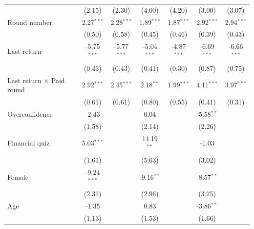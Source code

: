 \begin{table}[htbp]
\begin{tabular}{lcccccc}
                                           & (2.15)        & (2.30)        & (4.00)        & (4.20)        & (3.00)        & (3.07)\\   
      Round number                         & 2.27$^{***}$  & 2.28$^{***}$  & 1.89$^{***}$  & 1.87$^{***}$  & 2.92$^{***}$  & 2.94$^{***}$\\   
                                           & (0.50)        & (0.58)        & (0.45)        & (0.46)        & (0.39)        & (0.43)\\   
      Last return                          & -5.75$^{***}$ & -5.77$^{***}$ & -5.04$^{***}$ & -4.87$^{***}$ & -6.69$^{***}$ & -6.66$^{***}$\\   
                                           & (0.43)        & (0.43)        & (0.41)        & (0.30)        & (0.87)        & (0.75)\\   
      Last return $\times$ Paid round      & 2.92$^{***}$  & 2.45$^{***}$  & 2.18$^{**}$   & 1.99$^{***}$  & 4.11$^{***}$  & 3.97$^{***}$\\   
                                           & (0.61)        & (0.61)        & (0.80)        & (0.55)        & (0.41)        & (0.31)\\   
      Overconfidence                       & -2.43         &               & 0.04          &               & -5.58$^{**}$  &   \\   
                                           & (1.58)        &               & (2.14)        &               & (2.26)        &   \\   
      Financial quiz                       & 5.03$^{***}$  &               & 14.19$^{**}$  &               & -1.03         &   \\   
                                           & (1.61)        &               & (5.63)        &               & (3.02)        &   \\   
      Female                               & -9.24$^{***}$ &               & -9.16$^{**}$  &               & -8.57$^{**}$  &   \\   
                                           & (2.31)        &               & (2.96)        &               & (3.75)        &   \\   
      Age                                  & -1.35         &               & 0.83          &               & -3.86$^{**}$  &   \\   
                                           & (1.13)        &               & (1.53)        &               & (1.66)        &   \\   

\end{tabular}
\end{table}
